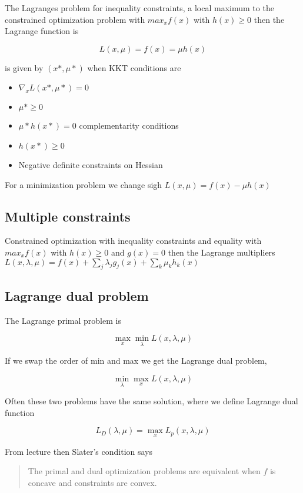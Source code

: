The Lagranges problem for inequality constraints, a local maximum to the constrained optimization problem with $max_x f(x)$ with $h(x) \geq 0$ then the Lagrange function is

\[
    L(x, \mu) = f(x) = \mu h(x)
\]

is given by $(x*, \mu *) $ when KKT conditions are

\begin{itemize}
  \item $\nabla_x L(x*, \mu *) = 0$
  \item $\mu* \geq 0$
  \item $\mu * h(x*) = 0$ complementarity conditions
  \item $h(x*) \geq 0$
  \item Negative definite constraints on Hessian
\end{itemize}

For a minimization problem we change sigh $L(x, \mu) = f(x) - \mu h(x)$

\subsection{Multiple constraints}

Constrained optimization with inequality constraints and equality with $max_x f(x)$ with $h(x) \geq 0$ and $g(x) = 0$ then the Lagrange multipliers $L(x , \lambda, \mu) = f(x) + \sum_{j} \lambda_j g_j (x) + \sum_{k} \mu_k h_k (x)$

\subsection{Lagrange dual problem}

The Lagrange primal problem is

\[
    \max\limits_x \min\limits_\lambda L(x, \lambda, \mu)
\]

If we swap the order of min and max we get the Lagrange dual
problem,

\[
    \min\limits_\lambda \max\limits_x L(x, \lambda, \mu)
\]

Often these two problems have the same solution, where we define Lagrange dual function

\[
    L_D(\lambda, \mu) = \max\limits_x L_p (x, \lambda, \mu)
\]

From lecture \cite[p.~14]{lecture5} then Slater's condition says

\begin{quote}
  The primal and dual optimization problems are equivalent when $f$ is concave and constraints are convex.
\end{quote}

